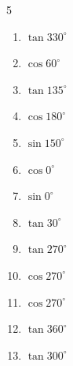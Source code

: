 \begin{multicols}{5}
\begin{enumerate}
  \item $\displaystyle \tan{330^\circ}$


  \item $\displaystyle \cos{60^\circ}$


  \item $\displaystyle \tan{135^\circ}$

        \phantom{$\displaystyle =-1$}

  \item $\displaystyle \cos{180^\circ}$

        \phantom{$\displaystyle =-1$}

  \item $\displaystyle \sin{150^\circ}$


  \item $\displaystyle \cos{0^\circ}$

        \phantom{$\displaystyle =1$}

  \item $\displaystyle \sin{0^\circ}$

        \phantom{$\displaystyle =0$}

  \item $\displaystyle \tan{30^\circ}$


  \item $\displaystyle \tan{270^\circ}$

        \phantom{$\displaystyle なし$}

  \item $\displaystyle \cos{270^\circ}$

        \phantom{$\displaystyle =0$}

  \item $\displaystyle \cos{270^\circ}$

        \phantom{$\displaystyle =0$}

  \item $\displaystyle \tan{360^\circ}$

        \phantom{$\displaystyle =0$}

\columnbreak %

  \item $\displaystyle \tan{300^\circ}$


\end{enumerate}
\end{multicols}
